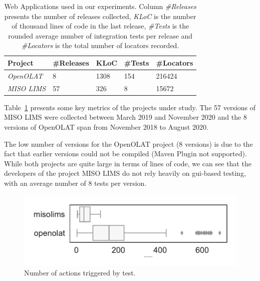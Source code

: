 \begin{table}
\centering
\caption{Web Applications used in our experiments. Column \emph{\#Releases} presents the number of releases collected, \emph{KLoC} is the number of thousand lines of code in the last release, \emph{\#Tests} is the rounded average number of integration tests per release and \emph{\#Locators} is the total number of locators recorded.}
\label{tab:hpath-protocol-projects}
\begin{tabular}{>{\raggedright}m{0.7in}>{\raggedleft}m{0.7in}>{\raggedleft}m{0.7in}>{\raggedleft}m{0.7in}>{\raggedleft}m{0.7in}}
\toprule
\textbf{\scriptsize{Project}} & \textbf{\scriptsize{\#Releases}} & \textbf{\scriptsize{KLoC}} & \textbf{\scriptsize{\#Tests}} & \textbf{\scriptsize{\#Locators}} \tabularnewline
\toprule
\scriptsize{\textit{OpenOLAT}} & \scriptsize{8} & \scriptsize{1308} & \scriptsize{154} & \scriptsize{216424} \tabularnewline
\scriptsize{\textit{MISO LIMS}} & \scriptsize{57} & \scriptsize{326} & \scriptsize{8} & \scriptsize{15672} \tabularnewline
\bottomrule
\end{tabular}
\end{table}

Table~\ref{tab:hpath-protocol-projects} presents some key metrics of the projects under study. The 57 versions of MISO LIMS were collected between March 2019 and November 2020 and the 8 versions of OpenOLAT span from November 2018 to August 2020. 

The low number of versions for the OpenOLAT project (8 versions) is due to the fact that earlier versions could not be compiled (Maven Plugin not supported). While both projects are quite large in terms of lines of code, we can see that the developers of the project MISO LIMS do not rely heavily on \gls{gui}-based testing, with an average number of 8 tests per version.

\begin{figure}
\centering
\includegraphics[width=0.8\columnwidth]{figures/hpath/selector-per-test-dist.pdf}
\caption{Number of actions triggered by test.}  
\label{fig:hpath-protocol-actions}
\end{figure}


